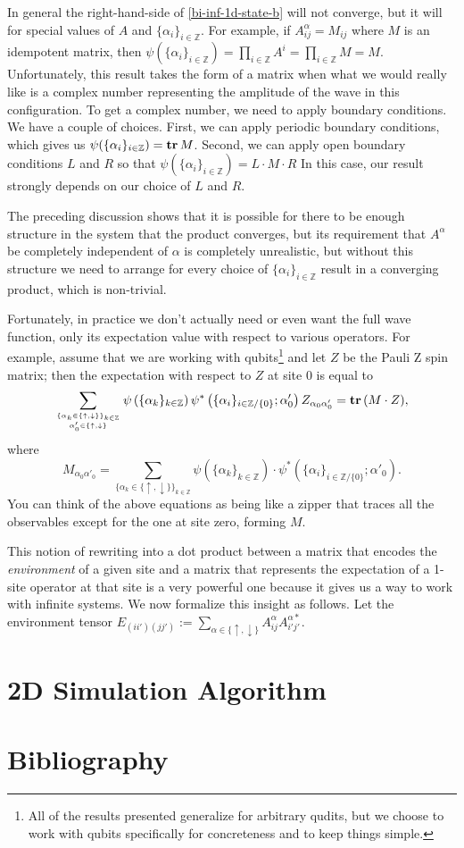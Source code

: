 \documentclass{article}
\newcommand{\paren}[1]{\left(#1\right)}
\newcommand{\tr}{\text{\textbf{tr}}\,}
\newcommand{\Z}{\mathbb{Z}}
\begin{document}
In general the right-hand-side of \ref{bi-inf-1d-state-b} will not converge, but it will for special values of $A$ and $\{\alpha_i\}_{i\in\Z}$.  For example, if $A^\alpha_{ij}=M_{ij}$ where $M$ is an idempotent matrix, then $\psi(\{\alpha_i\}_{i\in\Z})=\prod_{i\in\Z} A^i = \prod_{i\in\Z} M = M$.  Unfortunately, this result takes the form of a matrix when what we would really like is a complex number representing the amplitude of the wave in this configuration.  To get a complex number, we need to apply boundary conditions.  We have a couple of choices.  First, we can apply periodic boundary conditions, which gives us $\psi(\{\alpha_i\}_{i\in\Z})=\tr M$.  Second, we can apply open boundary conditions $L$ and $R$ so that $\psi(\{\alpha_i\}_{i\in\Z})=L\cdot M\cdot R$  In this case, our result strongly depends on our choice of $L$ and $R$.

The preceding discussion shows that it is possible for there to be enough structure in the system that the product converges, but its requirement that $A^\alpha$ be completely independent of $\alpha$ is completely unrealistic, but without this structure we need to arrange for every choice of $\{\alpha_i\}_{i\in\Z}$ result in a converging product, which is non-trivial.

Fortunately, in practice we don't actually need or even want the full wave function, only its expectation value with respect to various operators.  For example, assume that we are working with qubits\footnote{All of the results presented generalize for arbitrary qudits, but we choose to work with qubits specifically for concreteness and to keep things simple.} and let $Z$ be the Pauli Z spin matrix;  then the expectation with respect to $Z$ at site 0 is equal to
$$\sum_{\{\alpha_k\in\{\uparrow,\downarrow\}\}_{k\in\Z}\atop\alpha'_0\in\{\uparrow,\downarrow\}}\psi\paren{\{\alpha_k\}_{k\in\Z}}\psi^*\paren{\{\alpha_i\}_{i\in\Z/\{0\}};\alpha'_0} Z_{\alpha_0\alpha'_0}=\tr(M\cdot Z),$$ where $$M_{\alpha_0\alpha'_0}=\sum_{\{\alpha_k\in\{\uparrow,\downarrow\}\}_{k\in\Z}}\psi\paren{\{\alpha_k\}_{k\in\Z}}\cdot\psi^*\paren{\{\alpha_i\}_{i\in\Z/\{0\}};\alpha'_0}.$$
You can think of the above equations as being like a zipper that traces all the observables except for the one at site zero, forming $M$.

This notion of rewriting into a dot product between a matrix that encodes the \emph{environment} of a given site and a matrix that represents the expectation of a 1-site operator at that site is a very powerful one because it gives us a way to work with infinite systems.  We now formalize this insight as follows.  Let the environment tensor $E_{(ii')(jj')}:=\sum_{\alpha\in\{\uparrow,\downarrow\}}A^\alpha_{ij}A^{\alpha*}_{i'j'}.$

\part{2D Simulation Algorithm}
\label{2dsim}

\part*{Bibliography}



\end{document}
